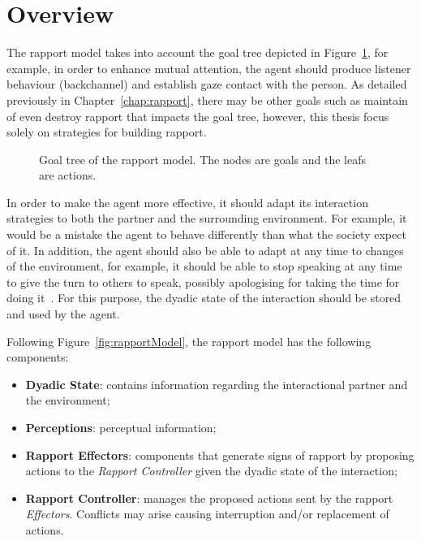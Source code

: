 \section{Overview}

The rapport model takes into account the goal tree depicted in Figure~\ref{table:rapportModel}, for example, in order to enhance mutual attention, the agent should produce listener behaviour (backchannel) and establish gaze contact with the person. As detailed previously in Chapter~\ref{chap:rapport}, there may be other goals such as maintain of even destroy rapport that impacts the goal tree, however, this thesis focus solely on strategies for building rapport.

\begin{figure}[H]
    \centering
    \caption{Goal tree of the rapport model. The nodes are goals and the leafs are actions.}
    \label{table:rapportModel}
\end{figure}

In order to make the agent more effective, it should adapt its interaction strategies to both the partner and the surrounding environment. For example, it would be a mistake the agent to behave differently than what the society expect of it. In addition, the agent should also be able to adapt at any time to changes of the environment, for example, it should be able to stop speaking at any time to give the turn to others to speak, possibly apologising for taking the time for doing it~\cite{Buschmeier2011}. For this purpose, the dyadic state of the interaction should be stored and used by the agent.

Following Figure~\ref{fig:rapportModel}, the rapport model has the following components:
\begin{itemize}
    \item \textbf{Dyadic State}: contains information regarding the interactional partner and the environment;
    \item \textbf{Perceptions}: perceptual information;
    \item \textbf{Rapport Effectors}: components that generate signs of rapport by proposing actions to the \textit{Rapport Controller} given the dyadic state of the interaction;
    \item \textbf{Rapport Controller}: manages the proposed actions sent by the rapport \textit{Effectors}. Conflicts may arise causing interruption and/or replacement of actions.
\end{itemize}


